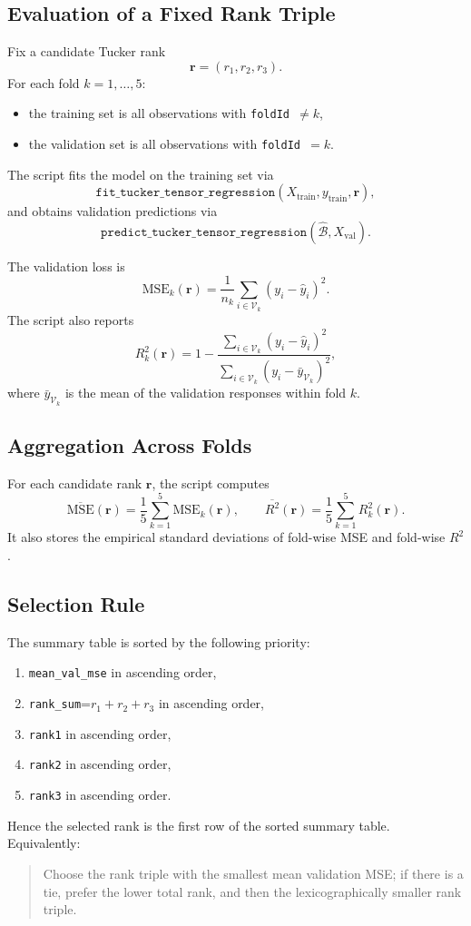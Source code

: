 \documentclass[11pt]{article}
\begin{document}
\subsection{Evaluation of a Fixed Rank Triple}
Fix a candidate Tucker rank
\[
\mathbf r=(r_1,r_2,r_3).
\]
For each fold $k=1,\dots,5$:
\begin{itemize}[leftmargin=2em]
\item the training set is all observations with \texttt{foldId $\neq k$},
\item the validation set is all observations with \texttt{foldId $= k$}.
\end{itemize}

The script fits the model on the training set via
\[
\texttt{fit\_tucker\_tensor\_regression}(X_{\mathrm{train}},y_{\mathrm{train}},\mathbf r),
\]
and obtains validation predictions via
\[
\texttt{predict\_tucker\_tensor\_regression}(\widehat{\mathcal B},X_{\mathrm{val}}).
\]

The validation loss is
\[
\mathrm{MSE}_k(\mathbf r)
=
\frac{1}{n_k}\sum_{i\in\mathcal V_k}(y_i-\widehat y_i)^2.
\]
The script also reports
\[
R_k^2(\mathbf r)
=
1-
\frac{\sum_{i\in\mathcal V_k}(y_i-\widehat y_i)^2}
{\sum_{i\in\mathcal V_k}(y_i-\bar y_{\mathcal V_k})^2},
\]
where $\bar y_{\mathcal V_k}$ is the mean of the validation responses within fold $k$.

\subsection{Aggregation Across Folds}
For each candidate rank $\mathbf r$, the script computes
\[
\overline{\mathrm{MSE}}(\mathbf r)
=
\frac{1}{5}\sum_{k=1}^5 \mathrm{MSE}_k(\mathbf r),
\qquad
\overline{R^2}(\mathbf r)
=
\frac{1}{5}\sum_{k=1}^5 R_k^2(\mathbf r).
\]
It also stores the empirical standard deviations of fold-wise MSE and fold-wise $R^2$.

\subsection{Selection Rule}
The summary table is sorted by the following priority:
\begin{enumerate}[leftmargin=2em,label=\arabic*.]
\item \texttt{mean\_val\_mse} in ascending order,
\item \texttt{rank\_sum}=$r_1+r_2+r_3$ in ascending order,
\item \texttt{rank1} in ascending order,
\item \texttt{rank2} in ascending order,
\item \texttt{rank3} in ascending order.
\end{enumerate}
Hence the selected rank is the first row of the sorted summary table.
Equivalently:
\begin{quote}
Choose the rank triple with the smallest mean validation MSE; if there is a tie, prefer the lower total rank, and then the lexicographically smaller rank triple.
\end{quote}
\end{document}
